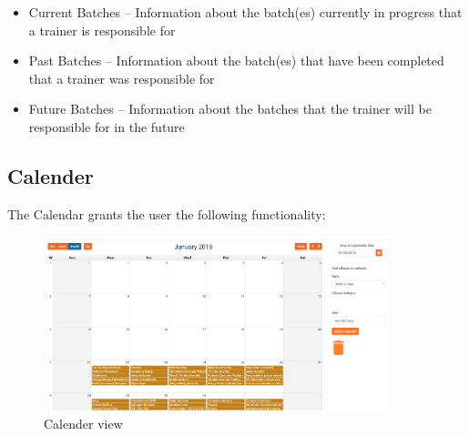 \begin{itemize}
    \item Current Batches – Information about the batch(es) currently in progress that a trainer is responsible for
    \item Past Batches – Information about the batch(es) that have been completed that a trainer was responsible for
    \item Future Batches – Information about the batches that the trainer will be responsible for in the future
\end{itemize}

\subsection{Calender}
The Calendar grants the user the following functionality:
\begin{figure}[htp]
\centering
\includegraphics[width=10cm]{images/calendarView}
\caption{Calender view}
\label{fig:lion}
\end{figure}

